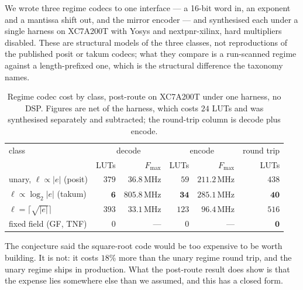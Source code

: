 We wrote three regime codecs to one interface --- a 16-bit word in, an exponent
and a mantissa shift out, and the mirror encoder --- and synthesised each under a
single harness on XC7A200T with Yosys and nextpnr-xilinx, hard multipliers
disabled. These are structural models of the three classes, not reproductions of
the published posit or takum codecs; what they compare is a run-scanned regime
against a length-prefixed one, which is the structural difference the taxonomy
names.

\begin{table}[t]\centering
\caption{Regime codec cost by class, post-route on XC7A200T under one harness,
no DSP. Figures are net of the harness, which costs $24$ LUTs and was synthesised
separately and subtracted; the round-trip column is decode plus encode.}
\label{tab:regimecost}
\begin{tabular}{lrrrrr}
\toprule
class & \multicolumn{2}{c}{decode} & \multicolumn{2}{c}{encode} & round trip \\
      & LUTs & $F_{\max}$ & LUTs & $F_{\max}$ & LUTs \\
\midrule
unary, $\ell \propto |e|$ (posit)          & $379$ & $36.8$\,MHz  & $59$  & $211.2$\,MHz & $438$ \\
$\ell \propto \log_2|e|$ (takum)           & $\mathbf{6}$ & $\mathbf{805.8}$\,MHz & $\mathbf{34}$ & $\mathbf{285.1}$\,MHz & $\mathbf{40}$ \\
$\ell = \lceil\sqrt{|e|}\rceil$            & $393$ & $33.1$\,MHz  & $123$ & $96.4$\,MHz  & $516$ \\
\midrule
fixed field (GF, TNF)                     & $0$   & ---          & $0$   & ---          & $\mathbf{0}$ \\
\bottomrule
\end{tabular}
\end{table}

The conjecture said the square-root code would be too expensive to be worth
building. It is not: it costs $18\%$ more than the unary regime round trip, and
the unary regime ships in production. What the post-route result does show is that the
expense lies somewhere else than we assumed, and this has a closed form.

